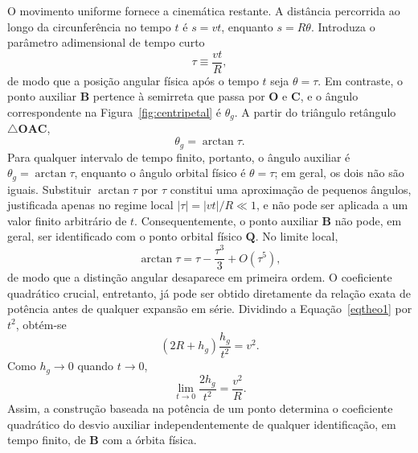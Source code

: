 \documentclass[12pt,a4paper]{article}
\newcommand{\pt}[1]{\mathbf{#1}}
\newcommand{\be}{\begin{equation}}
\newcommand{\ee}{\end{equation}}
\numberwithin{equation}{section}
\theoremstyle{remark}
\begin{document}
O movimento uniforme fornece a cinemática restante. A distância percorrida ao longo da circunferência no tempo $t$ é $s=vt$, enquanto $s=R\theta$. Introduza o parâmetro adimensional de tempo curto
\be
\tau\equiv\frac{vt}{R},
\label{eq:tau}
\ee
de modo que a posição angular física após o tempo $t$ seja $\theta=\tau$. Em contraste, o ponto auxiliar $\pt{B}$ pertence à semirreta que passa por $\pt{O}$ e $\pt{C}$, e o ângulo correspondente na Figura~\ref{fig:centripetal} é $\theta_g$. A partir do triângulo retângulo $\triangle \mathbf{OAC}$,
\be
\theta_g=\arctan\tau.
\label{eq:theta-g}
\ee
Para qualquer intervalo de tempo finito, portanto, o ângulo auxiliar é $\theta_g=\arctan\tau$, enquanto o ângulo orbital físico é $\theta=\tau$; em geral, os dois não são iguais. Substituir $\arctan\tau$ por $\tau$ constitui uma aproximação de pequenos ângulos, justificada apenas no regime local $|\tau|=|vt|/R\ll1$, e não pode ser aplicada a um valor finito arbitrário de $t$. Consequentemente, o ponto auxiliar $\pt{B}$ não pode, em geral, ser identificado com o ponto orbital físico $\pt{Q}$. No limite local,
\be
\arctan\tau=\tau-\frac{\tau^3}{3}+O(\tau^5),
\ee
de modo que a distinção angular desaparece em primeira ordem. O coeficiente quadrático crucial, entretanto, já pode ser obtido diretamente da relação exata de potência antes de qualquer expansão em série. Dividindo a Equação~\eqref{eqtheo1} por $t^2$, obtém-se
\be
\left(2R+h_g\right)\frac{h_g}{t^2}=v^2.
\ee
Como $h_g\to0$ quando $t\to0$,
\be
\lim_{t\to0}\frac{2h_g}{t^2}=\frac{v^2}{R}.
\label{eq:hg-limit}
\ee
Assim, a construção baseada na potência de um ponto determina o coeficiente quadrático do desvio auxiliar independentemente de qualquer identificação, em tempo finito, de $\pt{B}$ com a órbita física.
\end{document}
